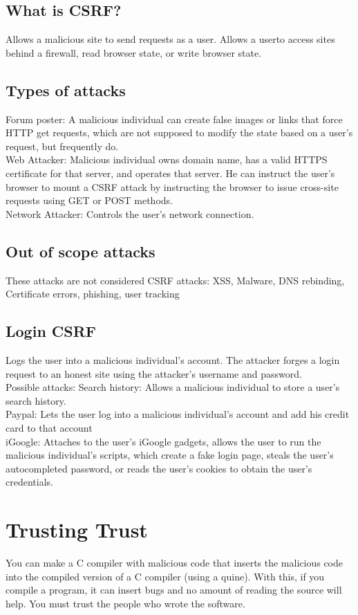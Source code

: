 \subsection{What is CSRF?}
Allows a malicious site to send requests as a user. Allows a userto access sites behind a firewall, read browser state, or write browser state.
\subsection{Types of attacks}
Forum poster: A malicious individual can create false images or links that force HTTP get requests, which are not supposed to modify the state based on a user's request, but frequently do.\\
Web Attacker: Malicious individual owns domain name, has a valid HTTPS certificate for that server, and operates that server. He can instruct the user's browser to mount a CSRF attack by instructing the browser to issue cross-site requests using GET or POST methods.\\
Network Attacker: Controls the user's network connection.
\subsection{Out of scope attacks}
These attacks are not considered CSRF attacks: XSS, Malware, DNS rebinding, Certificate errors, phishing, user tracking
\subsection{Login CSRF}
Logs the user into a malicious individual's account. The attacker forges a login request to an honest site using the attacker's username and password. \\
Possible attacks: Search history: Allows a malicious individual to store a user's search history.\\
Paypal: Lets the user log into a malicious individual's account and add his credit card to that account\\
iGoogle: Attaches to the user's iGoogle gadgets, allows the user to run the malicious individual's scripts, which create a fake login page, steals the user's autocompleted password, or reads the user's cookies to obtain the user's credentials.

\section{Trusting Trust}
You can make a C compiler with malicious code that inserts the malicious code into the compiled version of a C compiler (using a quine). With this, if you compile a program, it can insert bugs and no amount of reading the source will help. You must trust the people who wrote the software.

